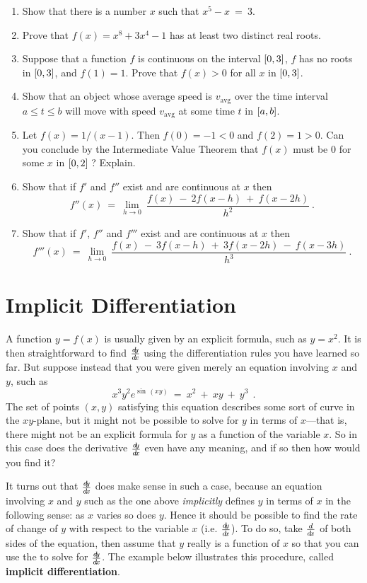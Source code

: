 {\begin{enumerate}[\bfseries 1.]
  maximum value and a minimum value in that interval? If so, then give an
  example; if not then explain why.
 \item Show that there is a number $x$ such that $x^5  - x ~=~ 3$.
 \item Prove that $f(x) = x^8 + 3x^4 - 1$ has at least two distinct real roots.
 \item Suppose that a  function $f$ is continuous on the interval $\lbrack 0,3 \rbrack$,
  $f$ has no roots in $\lbrack 0,3 \rbrack$, and $f(1) = 1$. Prove that $f(x) > 0$ for
  all $x$ in $\lbrack 0,3 \rbrack$.
 \item Show that an object whose average speed is $v_{\text{avg}}$ over the time
  interval $a\le t \le b$ will move with speed $v_{\text{avg}}$ at some time $t$
  in $\lbrack a,b \rbrack$.
 \item Let $f(x) = 1/(x-1)$. Then $f(0) = -1 <0$ and $f(2) = 1 > 0$. Can you
  conclude by the Intermediate Value Theorem that $f(x)$ must be $0$ for some
  $x$ in $\lbrack 0,2 \rbrack\;$? Explain.
 \item Show that if $f'$ and $f''$ exist and are continuous at $x$ then
\[
f''(x) ~=~ \lim_{h \to 0}~\frac{f(x) ~-~ 2 f(x-h) ~+~ f(x-2h)}{h^2} ~.
\]
 \item Show that if $f'$, $f''$ and $f'''$ exist and are continuous at $x$ then
\[
f'''(x) ~=~ \lim_{h \to 0}~\frac{f(x) ~-~ 3 f(x-h) ~+~ 3 f(x-2h) ~-~ f(x-3h)}{h^3} ~.
\]
\end{enumerate}
}
\newpage
\section{Implicit Differentiation}\label{sec:implicit-differentiation}
A function $y = f(x)$ is usually given by an explicit formula, such as
$y = x^2$. It is then straightforward to find $\frac{d\negmedspace y}{d\!x}$ using the differentiation
rules you have learned so far. But suppose instead that you were given merely an
equation involving $x$ and $y$, such as
\[
x^3 y^2 e^{\sin\,(xy)} ~=~ x^2 ~+~ xy ~+~ y^3 ~~.
\]
The set of points $(x,y)$ satisfying this equation describes some sort of curve
in the $xy$-plane, but it might not be possible to solve for $y$ in terms of
$x$---that is, there might not be an explicit formula for $y$ as a function of
the variable $x$. So in this case does the derivative $\frac{d\negmedspace y}{d\!x}$ even have any
meaning, and if so then how would you find it?

It turns out that $\frac{d\negmedspace y}{d\!x}$ does make sense in such a case, because an equation
involving $x$ and $y$ such as the one above
\emph{implicitly} defines $y$ in terms of
$x$ in the following sense: as $x$ varies so
does $y$. Hence it should be possible to find the rate of change of $y$
with respect to the variable $x$ (i.e. $\frac{d\negmedspace y}{d\!x}$). To do so, take $\frac{d}{d\!x}$ of both
sides of the equation, then assume that $y$ really is a function of $x$ so that
you can use the  to solve for $\frac{d\negmedspace y}{d\!x}$. The example below illustrates
this procedure, called \textbf{implicit differentiation}.

